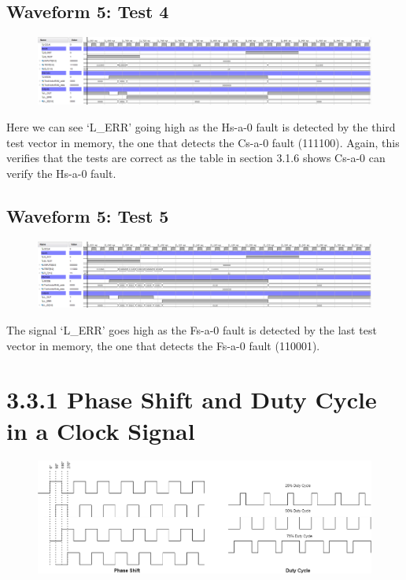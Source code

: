 \documentclass[11pt]{report}
\begin{document}
\subsection*{Waveform 5: Test 4}
\begin{figure}[H]
    \includegraphics[width=\columnwidth]{Reports/Lab4/Assets/3.2.3_test4.png}
\end{figure}

Here we can see `L\_ERR' going high as the Hs-a-0 fault is detected by the third test vector in memory, the one that detects the Cs-a-0 fault (111100). Again, this verifies that the tests are correct as the table in section 3.1.6 shows Cs-a-0 can verify the Hs-a-0 fault.


\subsection*{Waveform 5: Test 5}
\begin{figure}[H]
    \includegraphics[width=\columnwidth]{Reports/Lab4/Assets/3.2.3_test5.png}
\end{figure}

The signal `L\_ERR' goes high as the Fs-a-0 fault is detected by the last test vector in memory, the one that detects the Fs-a-0 fault (110001).


\section*{3.3.1 Phase Shift and Duty Cycle in a Clock Signal}
\begin{figure}[H]
    \includegraphics[width=\columnwidth]{Reports/Lab4/Assets/3.3.1_diagrams.png}
\end{figure}
\end{document}
